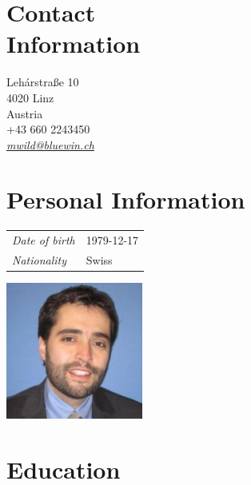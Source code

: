 \documentclass[line,11pt,a4paper]{../resume}
\newcommand{\mail}[1]{\textsl{\href{mailto:#1}{#1}}}
\begin{document}
\begin{resume}

\begin{multicols}{2}

\section{\mysidestyle Contact\\Information}\vspace{2mm}

Leh\'{a}rstra{\ss}e 10 \\
4020 Linz \\
Austria \\
+43 660 2243450 \\
\mail{mwild@bluewin.ch}

\section{\mysidestyle Personal Information}\vspace{2mm}

\begin{tabular}{@{}ll}
\textsl{Date of birth} & 1979-12-17 \\
\textsl{Nationality}   & Swiss
\end{tabular}

\columnbreak
\vspace*{-9mm}\hfill\includegraphics[width=45mm]{../mwild}

\end{multicols}

\section{\mysidestyle Education}\vspace{2mm}


\end{resume}
\end{document}
